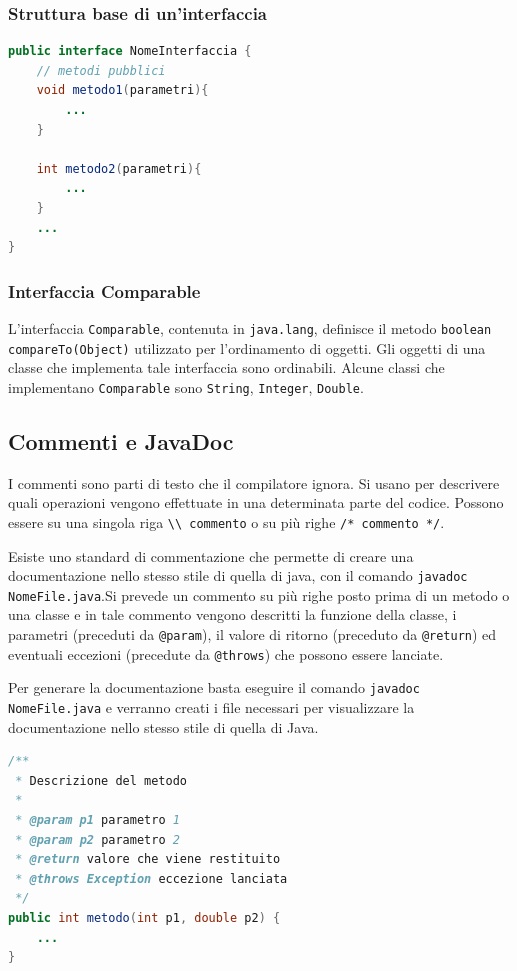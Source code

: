 \documentclass[a4paper]{article}
\begin{document}
\subsubsection*{Struttura base di un'interfaccia}
\begin{lstlisting}[language=Java]
public interface NomeInterfaccia {
	// metodi pubblici
	void metodo1(parametri){
		...
	}

	int metodo2(parametri){
		...
	}
	...
}
\end{lstlisting}

\subsubsection*{Interfaccia Comparable}
L'interfaccia \verb|Comparable|, contenuta in \verb|java.lang|, definisce il metodo \verb|boolean compareTo(Object)|
utilizzato per l'ordinamento di oggetti. Gli oggetti di una classe che implementa tale interfaccia sono ordinabili.
Alcune classi che implementano \verb|Comparable| sono \verb|String|, \verb|Integer|, \verb|Double|.

\subsection{Commenti e JavaDoc}
I commenti sono parti di testo che il compilatore ignora. Si usano per descrivere quali operazioni vengono effettuate
in una determinata parte del codice. Possono essere su una singola riga \verb|\\ commento| o su più righe \verb|/* commento */|.

Esiste uno standard di commentazione che permette di creare una documentazione nello stesso stile di quella di java,
con il  comando \verb|javadoc NomeFile.java|.Si prevede un commento su più righe posto prima di un metodo o una classe
e in tale commento vengono descritti la funzione della classe, i parametri (preceduti da \verb|@param|), il valore di
ritorno (preceduto da \verb|@return|) ed eventuali eccezioni (precedute da \verb|@throws|) che possono essere lanciate.

Per generare la documentazione basta eseguire il comando \verb|javadoc NomeFile.java| e verranno creati i file necessari
per visualizzare la documentazione nello stesso stile di quella di Java.

\begin{lstlisting}[language=Java]
/**
 * Descrizione del metodo
 * 
 * @param p1 parametro 1
 * @param p2 parametro 2
 * @return valore che viene restituito
 * @throws Exception eccezione lanciata
 */
public int metodo(int p1, double p2) {
	...
}
\end{lstlisting}
\end{document}
